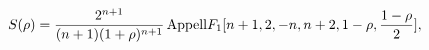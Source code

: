 \begin{equation}
S(\rho)=\frac{2^{n+1}}{(n+1)(1+\rho)^{n+1}}\,{\rm{Appell}}F_{1}[n+1,2,-n,n+2,1-\rho,\frac{1-\rho}{2}],\label{appel}
\end{equation}

